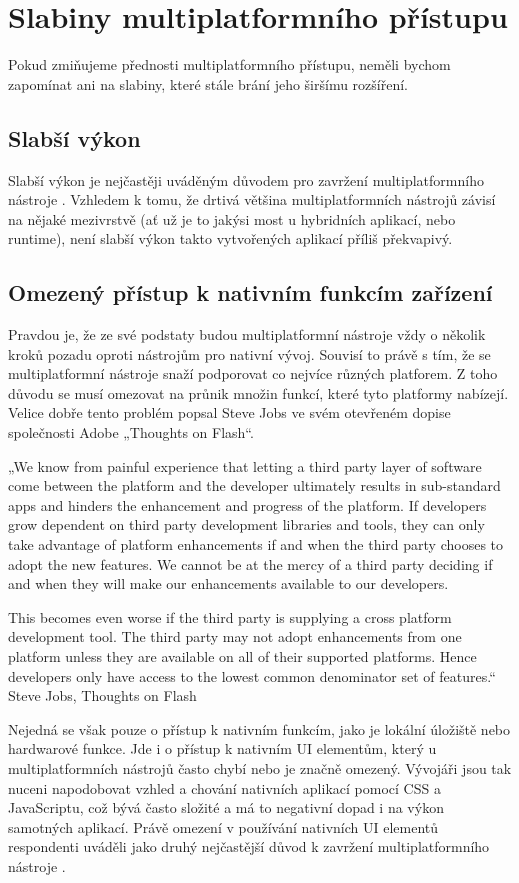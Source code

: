 \section{Slabiny multiplatformního přístupu}
Pokud zmiňujeme přednosti multiplatformního přístupu, neměli bychom zapomínat ani na slabiny, které stále brání jeho širšímu rozšíření.

\subsection{Slabší výkon}
Slabší výkon je nejčastěji uváděným důvodem pro zavržení multiplatformního nástroje \cite{visionmobile_survey}. Vzhledem k tomu, že drtivá většina multiplatformních nástrojů závisí na nějaké mezivrstvě (ať už je to jakýsi most u hybridních aplikací, nebo runtime), není slabší výkon takto vytvořených aplikací příliš překvapivý.

\subsection{Omezený přístup k nativním funkcím zařízení}
Pravdou je, že ze své podstaty budou multiplatformní nástroje vždy o několik kroků pozadu oproti nástrojům pro nativní vývoj. Souvisí to právě s tím, že se multiplatformní nástroje snaží podporovat co nejvíce různých platforem. Z toho důvodu se musí omezovat na průnik množin funkcí, které tyto platformy nabízejí. Velice dobře tento problém popsal Steve Jobs ve svém otevřeném dopise společnosti Adobe „Thoughts on Flash“.

„We know from painful experience that letting a third party layer of software come between the platform and the developer ultimately results in sub-standard apps and hinders the enhancement and progress of the platform. If developers grow dependent on third party development libraries and tools, they can only take advantage of platform enhancements if and when the third party chooses to adopt the new features. We cannot be at the mercy of a third party deciding if and when they will make our enhancements available to our developers.

This becomes even worse if the third party is supplying a cross platform development tool. The third party may not adopt enhancements from one platform unless they are available on all of their supported platforms. Hence developers only have access to the lowest common denominator set of features.“ Steve Jobs, Thoughts on Flash \cite{thoughts_on_flash}

Nejedná se však pouze o přístup k nativním funkcím, jako je lokální úložiště nebo hardwarové funkce. Jde i o přístup k nativním UI elementům, který u multiplatformních nástrojů často chybí nebo je značně omezený. Vývojáři jsou tak nuceni napodobovat vzhled a chování nativních aplikací pomocí CSS a JavaScriptu, což bývá často složité a má to negativní dopad i na výkon samotných aplikací. Právě omezení v používání nativních UI elementů respondenti uváděli jako druhý nejčastější důvod k zavržení multiplatformního nástroje \cite{visionmobile_survey}.

